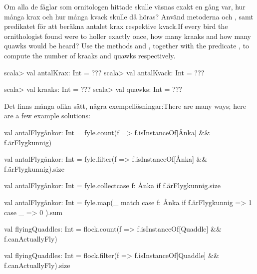 \Subtask \label{subtask:fyle:sound} \ifswedish Om alla de fåglar som ornitologen hittade skulle väsnas exakt en gång var, hur många krax och hur många kvack skulle då höras? Använd metoderna  och , samt predikatet  för att beräkna antalet krax respektive kvack.\else If every bird the ornithologist found were to holler exactly once, how many kraaks and how many quawks would be heard? Use the methods  and , together with the predicate , to compute the number of kraaks and quawks respectively.\fi
\ifswedish
\begin{REPL}
scala> val antalKrax: Int = ???
scala> val antalKvack: Int = ???
\end{REPL}
\else
\begin{REPL}
scala> val kraaks: Int = ???
scala> val quawks: Int = ???
\end{REPL}
\fi

\SOLUTION


\TaskSolved \what


\SubtaskSolved
\ifswedish Det finns många olika sätt, några exempellösningar:\else There are many ways; here are a few example solutions:\fi
\ifswedish
\begin{Code}
val antalFlygånkor: Int =
  fyle.count(f => f.isInstanceOf[Ånka] && f.ärFlygkunnig)
\end{Code}

\begin{Code}
val antalFlygånkor: Int =
  fyle.filter(f => f.isInstanceOf[Ånka] && f.ärFlygkunnig).size
\end{Code}

\begin{Code}
val antalFlygånkor: Int =
  fyle.collect{case f: Ånka if f.ärFlygkunnig}.size
\end{Code}

\begin{Code}
val antalFlygånkor: Int = fyle.map(_ match
  case f: Ånka if f.ärFlygkunnig => 1
  case _ => 0
).sum
\end{Code}
\else
\begin{Code}
val flyingQuaddles: Int =
  flock.count(f => f.isInstanceOf[Quaddle] && f.canActuallyFly)
\end{Code}

\begin{Code}
val flyingQuaddles: Int =
  flock.filter(f => f.isInstanceOf[Quaddle] && f.canActuallyFly).size
\end{Code}

